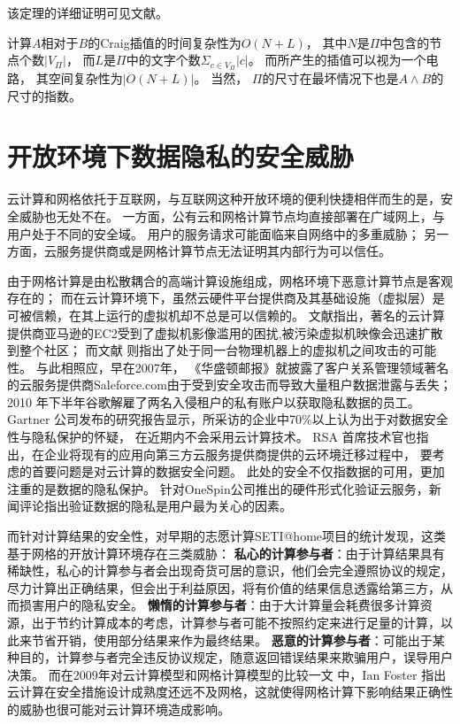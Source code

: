 该定理的详细证明可见文献。

计算$A$相对于$B$的Craig插值的时间复杂性为$O(N+L)$，
其中$N$是$\Pi$中包含的节点个数$|V_{\Pi}|$，
而$L$是$\Pi$中的文字个数$\Sigma _{c\in V_{\Pi}}|c|$。
而所产生的插值可以视为一个电路，
其空间复杂性为$|O(N+L)|$。
当然，
$\Pi$的尺寸在最坏情况下也是$A\wedge B$的尺寸的指数。

\section{开放环境下数据隐私的安全威胁}
云计算和网格依托于互联网，与互联网这种开放环境的便利快捷相伴而生的是，安全威胁也无处不在。
一方面，公有云和网格计算节点均直接部署在广域网上，与用户处于不同的安全域。
用户的服务请求可能面临来自网络中的多重威胁；
另一方面，云服务提供商或是网格计算节点无法证明其内部行为可以信任。

由于网格计算是由松散耦合的高端计算设施组成，网格环境下恶意计算节点是客观存在的；
而在云计算环境下，虽然云硬件平台提供商及其基础设施（虚拟层）是可被信赖，在其上运行的虚拟机却不总是可以信赖的。
文献指出，著名的云计算提供商亚马逊的EC2受到了虚拟机影像滥用的困扰,被污染虚拟机映像会迅速扩散到整个社区；
而文献 则指出了处于同一台物理机器上的虚拟机之间攻击的可能性。
与此相照应，早在2007年，
《华盛顿邮报》就披露了客户关系管理领域著名的云服务提供商Saleforce.com由于受到安全攻击而导致大量租户数据泄露与丢失；
2010 年下半年谷歌解雇了两名入侵租户的私有账户以获取隐私数据的员工。
Gartner 公司发布的研究报告显示，所采访的企业中70\%以上认为出于对数据安全性与隐私保护的怀疑，
在近期内不会采用云计算技术。
RSA 首席技术官也指出，在企业将现有的应用向第三方云服务提供商提供的云环境迁移过程中，
要考虑的首要问题是对云计算的数据安全问题。
此处的安全不仅指数据的可用，更加注重的是数据的隐私保护。
针对OneSpin公司推出的硬件形式化验证云服务，新闻评论指出验证数据的隐私是用户最为关心的因素。

而针对计算结果的安全性，对早期的志愿计算SETI@home项目的统计发现，这类基于网格的开放计算环境存在三类威胁：
\textbf{私心的计算参与者}：由于计算结果具有稀缺性，私心的计算参与者会出现奇货可居的意识，他们会完全遵照协议的规定，尽力计算出正确结果，但会出于利益原因，将有价值的结果信息透露给第三方，从而损害用户的隐私安全。
\textbf{懒惰的计算参与者}：由于大计算量会耗费很多计算资源，出于节约计算成本的考虑，计算参与者可能不按照约定来进行足量的计算，以此来节省开销，使用部分结果来作为最终结果。
\textbf{恶意的计算参与者}：可能出于某种目的，计算参与者完全违反协议规定，随意返回错误结果来欺骗用户，误导用户决策。
而在2009年对云计算模型和网格计算模型的比较一文 中，Ian Foster 指出云计算在安全措施设计成熟度还远不及网格，这就使得网格计算下影响结果正确性的威胁也很可能对云计算环境造成影响。

